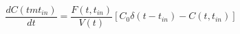 \begin{equation}
\frac{dC(tmt_{in})}{dt} = \frac{F(t,t_{in})}{V(t)}[C_0\delta(t-t_{in})-C(t,t_{in})]
\end{equation}